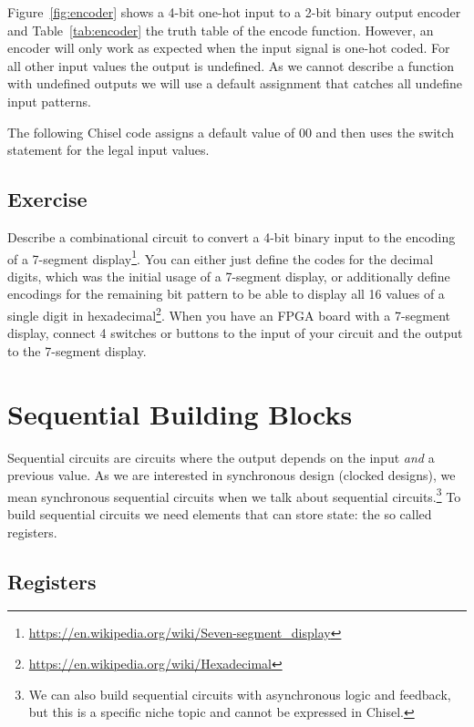 \documentclass[%
    10pt,
    headinclude, footexclude,
    openright, %
    notitlepage,
    cleardoubleempty,
    headsepline,
    pointlessnumbers,
    bibtotoc, idxtotoc,
    ]{scrbook}
\newcommand{\myref}[2]{\href{#1}{#2}}
\renewcommand{\myref}[2]{{#2}{\footnote{\url{#1}}}}
\begin{document}
Figure~\ref{fig:encoder} shows a 4-bit one-hot input to a 2-bit binary output encoder and
Table~\ref{tab:encoder} the truth table of the encode function. However, an encoder will
only work as expected when the input signal is one-hot coded. For all other input values the output
is undefined. As we cannot describe a function with undefined outputs we will use a default
assignment that catches all undefine input patterns.

The following Chisel code assigns a default value of 00 and then uses the switch statement
for the legal input values.


\section{Exercise}

Describe a combinational circuit to convert a 4-bit binary input to the encoding of a
\myref{https://en.wikipedia.org/wiki/Seven-segment_display}{7-segment display}.
You can either just define the codes for the decimal digits, which was the initial
usage of a 7-segment display, or additionally define encodings for the remaining bit pattern
to be able to display all 16 values of a single digit in
\myref{https://en.wikipedia.org/wiki/Hexadecimal}{hexadecimal}.
When you have an FPGA board with a 7-segment display, connect 4 switches or
buttons to the input of your circuit and the output to the 7-segment display.

\chapter{Sequential Building Blocks}

Sequential circuits are circuits where the output depends on the input \emph{and}
a previous value. As we are interested in synchronous design (clocked designs),
we mean synchronous sequential circuits when we talk about sequential
circuits.\footnote{We can also build sequential circuits with asynchronous logic and
feedback, but this is a specific niche topic and cannot be expressed in Chisel.}
To build sequential circuits we need elements that can store state: the so
called registers.

\section{Registers}
\end{document}
